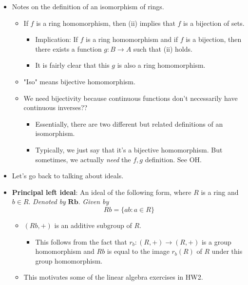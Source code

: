 \documentclass[../notes.tex]{subfiles}
\begin{document}
\begin{itemize}
\begin{enumerate}[label={(\roman*)}]
    \end{enumerate}
    \item Notes on the definition of an isomorphism of rings.
    \begin{itemize}
        \item If $f$ is a ring homomorphism, then (ii) implies that $f$ is a bijection of sets.
        \begin{itemize}
            \item Implication: If $f$ is a ring homomorphism and if $f$ is a bijection, then there exists a function $g:B\to A$ such that (ii) holds.
            \item It is fairly clear that this $g$ is also a ring homomorphism.
        \end{itemize}
        \item "Iso" means bijective homomorphism.
        \item We need bijectivity because continuous functions don't necessarily have continuous inverses??
        \begin{itemize}
            \item Essentially, there are two different but related definitions of an isomorphism.
            \item Typically, we just say that it's a bijective homomorphism. But sometimes, we actually \emph{need} the $f,g$ definition. See OH.
        \end{itemize}
    \end{itemize}
    \item Let's go back to talking about ideals.
    \item \textbf{Principal left ideal}: An ideal of the following form, where $R$ is a ring and $b\in R$. \emph{Denoted by} $\bm{Rb}$. \emph{Given by}
    \begin{equation*}
        Rb = \{ab:a\in R\}
    \end{equation*}
    \begin{itemize}
        \item $(Rb,+)$ is an additive subgroup of $R$.
        \begin{itemize}
            \item This follows from the fact that $r_b:(R,+)\to(R,+)$ is a group homomorphism and $Rb$ is equal to the image $r_b(R)$ of $R$ under this group homomorphism.
        \end{itemize}
        \item This motivates some of the linear algebra exercises in HW2.
        \begin{itemize}

\end{itemize}
\end{itemize}
\end{itemize}
\end{document}
